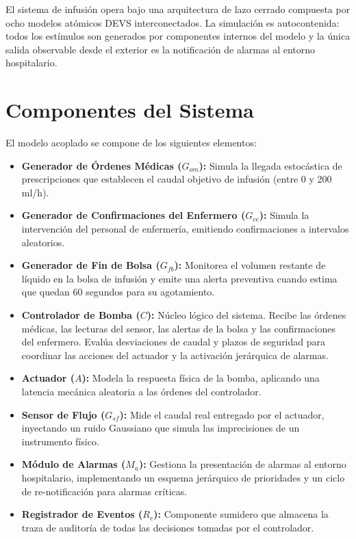 El sistema de infusión opera bajo una arquitectura de lazo cerrado compuesta por ocho modelos atómicos DEVS interconectados. La simulación es autocontenida: todos los estímulos son generados por componentes internos del modelo y la única salida observable desde el exterior es la notificación de alarmas al entorno hospitalario.

\section{Componentes del Sistema}
El modelo acoplado se compone de los siguientes elementos:
\begin{itemize}
    \item \textbf{Generador de Órdenes Médicas ($G_{om}$):} Simula la llegada estocástica de prescripciones que establecen el caudal objetivo de infusión (entre 0 y 200 ml/h).
    \item \textbf{Generador de Confirmaciones del Enfermero ($G_{ce}$):} Simula la intervención del personal de enfermería, emitiendo confirmaciones a intervalos aleatorios.
    \item \textbf{Generador de Fin de Bolsa ($G_{fb}$):} Monitorea el volumen restante de líquido en la bolsa de infusión y emite una alerta preventiva cuando estima que quedan 60 segundos para su agotamiento.
    \item \textbf{Controlador de Bomba ($C$):} Núcleo lógico del sistema. Recibe las órdenes médicas, las lecturas del sensor, las alertas de la bolsa y las confirmaciones del enfermero. Evalúa desviaciones de caudal y plazos de seguridad para coordinar las acciones del actuador y la activación jerárquica de alarmas.
    \item \textbf{Actuador ($A$):} Modela la respuesta física de la bomba, aplicando una latencia mecánica aleatoria a las órdenes del controlador.
    \item \textbf{Sensor de Flujo ($G_{sf}$):} Mide el caudal real entregado por el actuador, inyectando un ruido Gaussiano que simula las imprecisiones de un instrumento físico.
    \item \textbf{Módulo de Alarmas ($M_a$):} Gestiona la presentación de alarmas al entorno hospitalario, implementando un esquema jerárquico de prioridades y un ciclo de re-notificación para alarmas críticas.
    \item \textbf{Registrador de Eventos ($R_e$):} Componente sumidero que almacena la traza de auditoría de todas las decisiones tomadas por el controlador.
\end{itemize}

